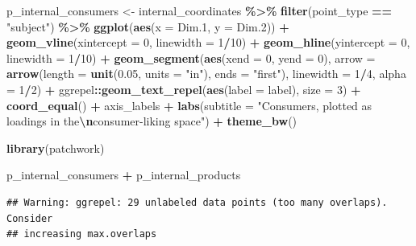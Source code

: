 \documentclass[
]{book}
\newenvironment{Shaded}{\begin{snugshade}}{\end{snugshade}}
\newcommand{\AttributeTok}[1]{\textcolor[rgb]{0.13,0.29,0.53}{#1}}
\newcommand{\DecValTok}[1]{\textcolor[rgb]{0.00,0.00,0.81}{#1}}
\newcommand{\FloatTok}[1]{\textcolor[rgb]{0.00,0.00,0.81}{#1}}
\newcommand{\FunctionTok}[1]{\textcolor[rgb]{0.13,0.29,0.53}{\textbf{#1}}}
\newcommand{\NormalTok}[1]{#1}
\newcommand{\OtherTok}[1]{\textcolor[rgb]{0.56,0.35,0.01}{#1}}
\newcommand{\SpecialCharTok}[1]{\textcolor[rgb]{0.81,0.36,0.00}{\textbf{#1}}}
\newcommand{\StringTok}[1]{\textcolor[rgb]{0.31,0.60,0.02}{#1}}
\begin{document}
\begin{Shaded}
\begin{Highlighting}[]
\NormalTok{p\_internal\_consumers }\OtherTok{\textless{}{-}} 
\NormalTok{  internal\_coordinates }\SpecialCharTok{\%\textgreater{}\%}
  \FunctionTok{filter}\NormalTok{(point\_type }\SpecialCharTok{==} \StringTok{"subject"}\NormalTok{) }\SpecialCharTok{\%\textgreater{}\%}
  \FunctionTok{ggplot}\NormalTok{(}\FunctionTok{aes}\NormalTok{(}\AttributeTok{x =}\NormalTok{ Dim}\FloatTok{.1}\NormalTok{, }\AttributeTok{y =}\NormalTok{ Dim}\FloatTok{.2}\NormalTok{)) }\SpecialCharTok{+} 
  \FunctionTok{geom\_vline}\NormalTok{(}\AttributeTok{xintercept =} \DecValTok{0}\NormalTok{, }\AttributeTok{linewidth =} \DecValTok{1}\SpecialCharTok{/}\DecValTok{10}\NormalTok{) }\SpecialCharTok{+} 
  \FunctionTok{geom\_hline}\NormalTok{(}\AttributeTok{yintercept =} \DecValTok{0}\NormalTok{, }\AttributeTok{linewidth =} \DecValTok{1}\SpecialCharTok{/}\DecValTok{10}\NormalTok{) }\SpecialCharTok{+}
  \FunctionTok{geom\_segment}\NormalTok{(}\FunctionTok{aes}\NormalTok{(}\AttributeTok{xend =} \DecValTok{0}\NormalTok{, }\AttributeTok{yend =} \DecValTok{0}\NormalTok{),}
               \AttributeTok{arrow =} \FunctionTok{arrow}\NormalTok{(}\AttributeTok{length =} \FunctionTok{unit}\NormalTok{(}\FloatTok{0.05}\NormalTok{, }\AttributeTok{units =} \StringTok{"in"}\NormalTok{), }\AttributeTok{ends =} \StringTok{"first"}\NormalTok{),}
               \AttributeTok{linewidth =} \DecValTok{1}\SpecialCharTok{/}\DecValTok{4}\NormalTok{, }\AttributeTok{alpha =} \DecValTok{1}\SpecialCharTok{/}\DecValTok{2}\NormalTok{) }\SpecialCharTok{+} 
\NormalTok{  ggrepel}\SpecialCharTok{::}\FunctionTok{geom\_text\_repel}\NormalTok{(}\FunctionTok{aes}\NormalTok{(}\AttributeTok{label =}\NormalTok{ label), }\AttributeTok{size =} \DecValTok{3}\NormalTok{) }\SpecialCharTok{+} 
  \FunctionTok{coord\_equal}\NormalTok{() }\SpecialCharTok{+} 
\NormalTok{  axis\_labels }\SpecialCharTok{+} 
  \FunctionTok{labs}\NormalTok{(}\AttributeTok{subtitle =} \StringTok{"Consumers, plotted as loadings in the}\SpecialCharTok{\textbackslash{}n}\StringTok{consumer{-}liking space"}\NormalTok{) }\SpecialCharTok{+} 
  \FunctionTok{theme\_bw}\NormalTok{()}

\FunctionTok{library}\NormalTok{(patchwork)}

\NormalTok{p\_internal\_consumers }\SpecialCharTok{+}\NormalTok{ p\_internal\_products}
\end{Highlighting}
\end{Shaded}

\begin{verbatim}
## Warning: ggrepel: 29 unlabeled data points (too many overlaps). Consider
## increasing max.overlaps
\end{verbatim}
\end{document}
